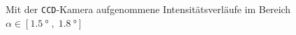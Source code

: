\begin{figure}[!ht]
    \caption{Mit der \texttt{CCD}-Kamera aufgenommene Intensitätsverläufe im Bereich \\$\alpha \in \left[\SI{1.5}{\degree}\; , \; \SI{1.8}{\degree}\right]$}\label{fig:peaks_all_a}
\end{figure}
